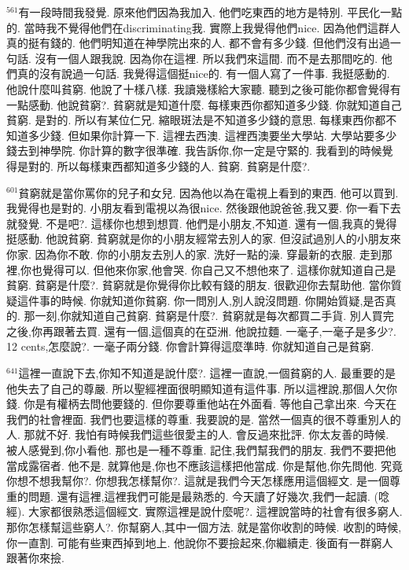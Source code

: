 \documentclass{book}
\begin{document}
$^{561}$有一段時間我發覺.
原來他們因為我加入.
他們吃東西的地方是特別.
平民化一點的.
當時我不覺得他們在discriminating我.
實際上我覺得他們nice.
因為他們這群人真的挺有錢的.
他們明知道在神學院出來的人.
都不會有多少錢.
但他們沒有出過一句話.
沒有一個人跟我說.
因為你在這裡.
所以我們來這間.
而不是去那間吃的.
他們真的沒有說過一句話.
我覺得這個挺nice的.
有一個人寫了一件事.
我挺感動的.
他說什麼叫貧窮.
他說了十樣八樣.
我讀幾樣給大家聽.
聽到之後可能你都會覺得有一點感動.
他說貧窮?.
貧窮就是知道什麼.
每樣東西你都知道多少錢.
你就知道自己貧窮.
是對的.
所以有某位仁兄.
縮眼斑法是不知道多少錢的意思.
每樣東西你都不知道多少錢.
但如果你計算一下.
這裡去西澳.
這裡西澳要坐大學站.
大學站要多少錢去到神學院.
你計算的數字很準確.
我告訴你,你一定是守緊的.
我看到的時候覺得是對的.
所以每樣東西都知道多少錢的人.
貧窮.
貧窮是什麼?.

$^{601}$貧窮就是當你罵你的兒子和女兒.
因為他以為在電視上看到的東西.
他可以買到.
我覺得也是對的.
小朋友看到電視以為很nice.
然後跟他說爸爸,我又要.
你一看下去就發覺.
不是吧?.
這樣你也想到想買.
他們是小朋友,不知道.
還有一個,我真的覺得挺感動.
他說貧窮.
貧窮就是你的小朋友經常去別人的家.
但沒試過別人的小朋友來你家.
因為你不敢.
你的小朋友去別人的家.
洗好一點的澡.
穿最新的衣服.
走到那裡,你也覺得可以.
但他來你家,他會哭.
你自己又不想他來了.
這樣你就知道自己是貧窮.
貧窮是什麼?.
貧窮就是你覺得你比較有錢的朋友.
很歡迎你去幫助他.
當你質疑這件事的時候.
你就知道你貧窮.
你一問別人,別人說沒問題.
你開始質疑,是否真的.
那一刻,你就知道自己貧窮.
貧窮是什麼?.
貧窮就是每次都買二手貨.
別人買完之後,你再跟著去買.
還有一個,這個真的在亞洲.
他說拉麵.
一毫子,一毫子是多少?.
12 cents,怎麼說?.
一毫子兩分錢.
你會計算得這麼準時.
你就知道自己是貧窮.

$^{641}$這裡一直說下去,你知不知道是說什麼?.
這裡一直說,一個貧窮的人.
最重要的是他失去了自己的尊嚴.
所以聖經裡面很明顯知道有這件事.
所以這裡說,那個人欠你錢.
你是有權柄去問他要錢的.
但你要尊重他站在外面看.
等他自己拿出來.
今天在我們的社會裡面.
我們也要這樣的尊重.
我要說的是.
當然一個真的很不尊重別人的人.
那就不好.
我怕有時候我們這些很愛主的人.
會反過來批評.
你太友善的時候.
被人感覺到,你小看他.
那也是一種不尊重.
記住,我們幫我們的朋友.
我們不要把他當成露宿者.
他不是.
就算他是,你也不應該這樣把他當成.
你是幫他,你先問他.
究竟你想不想我幫你?.
你想我怎樣幫你?.
這就是我們今天怎樣應用這個經文.
是一個尊重的問題.
還有這裡,這裡我們可能是最熟悉的.
今天讀了好幾次,我們一起讀.
(唸經).
大家都很熟悉這個經文.
實際這裡是說什麼呢?.
這裡說當時的社會有很多窮人.
那你怎樣幫這些窮人?.
你幫窮人,其中一個方法.
就是當你收割的時候.
收割的時候,你一直割.
可能有些東西掉到地上.
他說你不要撿起來,你繼續走.
後面有一群窮人跟著你來撿.
\end{document}
